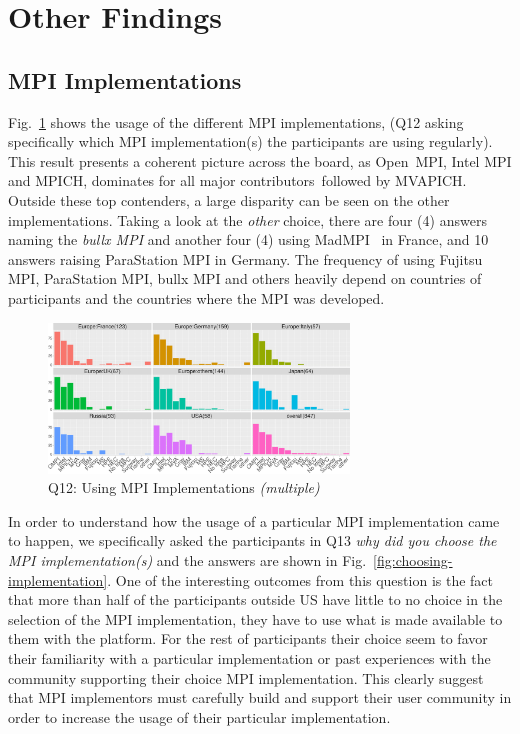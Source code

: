 \documentclass[preprint,5p,times]{elsarticle}
\def\myquote#1{{\it #1}}
\newcommand{\revision}[2]{{\color{blue}#2}}
\def\mcountries{major contributors\xspace{}}%
\begin{document}
\section{Other Findings}

\subsection{MPI Implementations}

 Fig.~\ref{fig:using-implementations} shows the usage of the different MPI
 implementations, (Q12 asking specifically which MPI implementation(s) the
 participants are using regularly). This result presents a coherent picture
 across the board, as Open~MPI, Intel MPI and MPICH, dominates \revision{in}{for} all
 \mcountries\ followed by MVAPICH. Outside these top contenders, a large
 disparity can be seen on the other implementations. Taking a look at the
 \myquote{other} choice, there are four (4) answers naming the \myquote{bullx
 MPI} and another four (4) using MadMPI~\cite{madmpi} in France, and 10 answers
 raising ParaStation MPI in Germany. The frequency of using Fujitsu MPI,
 ParaStation MPI, bullx MPI and others heavily depend on countries of
 participants and the countries where the MPI was developed.

  \begin{figure}[tb]
    \begin{center}
      \includegraphics[width=8.0cm]{R-scripts/Q12.pdf}
      \caption{Q12: Using MPI Implementations {\it(multiple)}}
      \label{fig:using-implementations}
\vspace{-3mm}%
    \end{center}
  \end{figure}

In order to understand how the usage of a particular MPI implementation came to
happen, we specifically asked the participants in Q13 \myquote{why did you
choose the MPI implementation(s)} and the answers are shown in
Fig.~\ref{fig:choosing-implementation}.
%
One of the interesting outcomes from this question is the fact that more than
half of the participants outside US have little to no choice in the selection of
the MPI implementation, they have to use what is made available to them with the
platform. For the rest of participants their choice seem to favor their
familiarity with a particular implementation or past experiences with the
community supporting their choice MPI implementation.
%
This clearly suggest that MPI implementors must carefully build and support
their \revision{users}{user} community in order to increase the usage of their particular
implementation.
\end{document}
